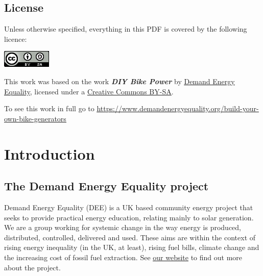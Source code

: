 \documentclass{article}
\theoremstyle{definition}
\theoremstyle{definition}
\theoremstyle{remark}
\begin{document}
  \subsection*{License} %
  \label{sub:license}

    Unless otherwise specified, everything in this PDF is covered by the following licence:

    \includegraphics[]{../Images/image_0_2_(license).png} \newline

    This work was based on the work \textbf{\textit{DIY Bike Power}} by \href{https://www.demandenergyequality.org/}{\underline{Demand Energy Equality}}, licensed under a \href{https://creativecommons.org/licenses/by-sa/4.0/legalcode}{\underline{Creative Commons BY-SA}}.

    To see this work in full go to \href{https://www.demandenergyequality.org/build-your-own-bike-generators}{\underline{https://www.demandenergyequality.org/build-your-own-bike-generators}}
  


\newpage

{\color{blue}\section{Introduction}} %
\label{sec:introduction}

  {\color{blue}\subsection{The Demand Energy Equality project}} %
  \label{sub:the_demand_energy_equality_project}

    Demand Energy Equality (DEE) is a UK based community energy project that seeks to provide practical energy education, relating mainly to solar generation. We are a group working for systemic change in the way energy is produced, distributed, controlled, delivered and used. These aims are within the context of rising energy inequality (in the UK, at least), rising fuel bills, climate change and the increasing cost of fossil fuel extraction. See \href{https://www.demandenergyequality.org/about/}{\underline{our website}} to find out more about the project.
\end{document}
